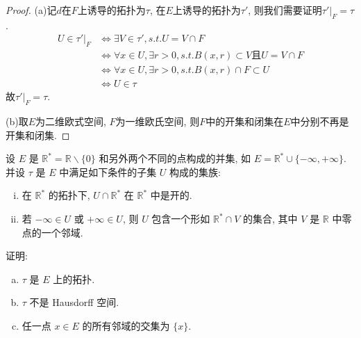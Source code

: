 \begin{proof}
(a)记$d$在$F$上诱导的拓扑为$\tau$, 在$E$上诱导的拓扑为$\tau'$, 则我们需要证明$\tau'|_F=\tau$.
\[\begin{split}
U\in\tau'|_F&\Leftrightarrow\exists V\in\tau',s.t.U=V\cap F\\
&\Leftrightarrow\forall x\in U,\exists r>0,s.t.B(x,r)\subset V\mbox{且}U=V\cap F\\
&\Leftrightarrow\forall x\in U,\exists r>0,s.t.B(x,r)\cap F\subset U\\
&\Leftrightarrow U\in\tau
\end{split}\]
故$\tau'|_F=\tau$.

(b)取$E$为二维欧式空间, $F$为一维欧氏空间, 则$F$中的开集和闭集在$E$中分别不再是开集和闭集.
\end{proof}

\begin{exercise}
设 $E$ 是 $\mathbb{R}^*=\mathbb{R}\backslash\{0\}$ 和另外两个不同的点构成的并集,
如 $E=\mathbb{R}^*\cup\{-\infty,+\infty\}$. 并设 $\tau$ 是 $E$ 中满足如下条件的子集 $U$ 构成的集族:
\begin{enumerate}[(i)]
    \item 在 $\mathbb{R}^*$ 的拓扑下, $U\cap\mathbb{R}^*$ 在 $\mathbb{R}^*$ 中是开的.
    \item 若 $-\infty\in U$ 或 $+\infty\in U$, 则 $U$ 包含一个形如 $\mathbb{R}^*\cap V$ 的集合, 其中 $V$ 是 $\mathbb{R}$ 中零点的一个邻域.
\end{enumerate}
证明:
\begin{enumerate}[(a)]
    \item $\tau$ 是 $E$ 上的拓扑.
    \item $\tau$ 不是 Hausdorff 空间.
    \item 任一点 $x\in E$ 的所有邻域的交集为 $\{x\}$.
\end{enumerate}
\end{exercise}

